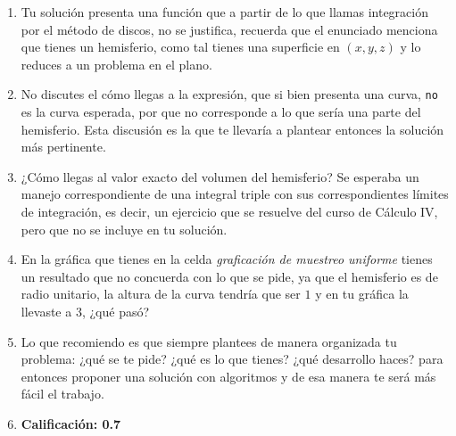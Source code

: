 \begin{enumerate}
\item Tu solución presenta una función que a partir de lo que llamas integración por el método de discos, no se justifica, recuerda que el enunciado menciona que tienes un hemisferio, como tal tienes una superficie en $(x, y, z)$ y lo reduces a un problema en el plano.
\item No discutes el cómo llegas a la expresión, que si bien presenta una curva, \texttt{no} es la curva esperada, por que no corresponde a lo que sería una parte del hemisferio. Esta discusión es la que te llevaría a plantear entonces la solución más pertinente.
\item ¿Cómo llegas al valor exacto del volumen del hemisferio? Se esperaba un manejo correspondiente de una integral triple con sus correspondientes límites de integración, es decir, un ejercicio que se resuelve del curso de Cálculo IV, pero que no se incluye en tu solución.
\item En la gráfica que tienes en la celda \emph{graficación de muestreo uniforme} tienes un resultado que no concuerda con lo que se pide, ya que el hemisferio es de radio unitario, la altura de la curva tendría que ser $1$ y en tu gráfica la llevaste a $3$, ¿qué pasó?
\item Lo que recomiendo es que siempre plantees de manera organizada tu problema: ¿qué se te pide? ¿qué es lo que tienes? ¿qué desarrollo haces? para entonces proponer una solución con algoritmos y de esa manera te será más fácil el trabajo.
\item \textbf{Calificación: 0.7}
\end{enumerate}

